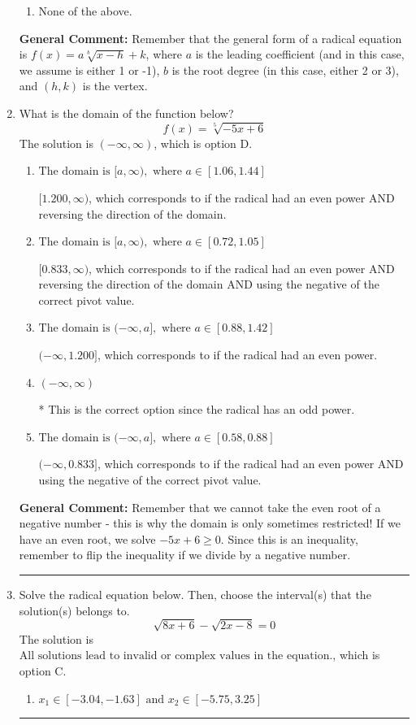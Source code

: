 \documentclass{extbook}[14pt]
\newcommand{\litem}[1]{\item #1

\rule{\textwidth}{0.4pt}}
\begin{document}
\begin{enumerate}
{\begin{enumerate}[label=\Alph*.]
\begin{multicols}{2}
\end{multicols}\item None of the above.\end{enumerate}
\textbf{General Comment:} Remember that the general form of a radical equation is $ f(x) = a \sqrt[b]{x - h} + k $, where $a$ is the leading coefficient (and in this case, we assume is either 1 or -1), $b$ is the root degree (in this case, either 2 or 3), and $(h, k)$ is the vertex.
}
\litem{
What is the domain of the function below?
\[ f(x) = \sqrt[5]{-5 x + 6} \]The solution is \( (-\infty, \infty) \), which is option D.\begin{enumerate}[label=\Alph*.]
\item \( \text{The domain is } [a, \infty), \text{   where } a \in [1.06, 1.44] \)

$[1.200, \infty)$, which corresponds to if the radical had an even power AND reversing the direction of the domain.
\item \( \text{The domain is } [a, \infty), \text{   where } a \in [0.72, 1.05] \)

$[0.833, \infty)$, which corresponds to if the radical had an even power AND reversing the direction of the domain AND using the negative of the correct pivot value.
\item \( \text{The domain is } (-\infty, a], \text{   where } a \in [0.88, 1.42] \)

$(-\infty, 1.200]$, which corresponds to if the radical had an even power.
\item \( (-\infty, \infty) \)

* This is the correct option since the radical has an odd power.
\item \( \text{The domain is } (-\infty, a], \text{   where } a \in [0.58, 0.88] \)

$(-\infty, 0.833]$, which corresponds to if the radical had an even power AND using the negative of the correct pivot value.
\end{enumerate}

\textbf{General Comment:} Remember that we cannot take the even root of a negative number - this is why the domain is only sometimes restricted! If we have an even root, we solve $-5 x + 6 \geq 0$. Since this is an inequality, remember to flip the inequality if we divide by a negative number.
}
\litem{
Solve the radical equation below. Then, choose the interval(s) that the solution(s) belongs to.
\[ \sqrt{8 x + 6} - \sqrt{2 x - 8} = 0 \]The solution is \( \text{All solutions lead to invalid or complex values in the equation.} \), which is option C.\begin{enumerate}[label=\Alph*.]
\item \( x_1 \in [-3.04, -1.63] \text{ and } x_2 \in [-5.75,3.25] \)


\end{enumerate}}
\end{enumerate}
\end{document}

